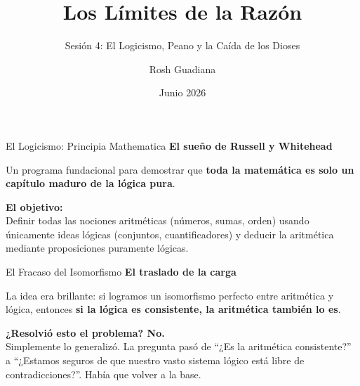 \documentclass[10pt, aspectratio=169]{beamer}
\title{Los Límites de la Razón}
\subtitle{Sesión 4: El Logicismo, Peano y la Caída de los Dioses}
\author{Rosh Guadiana}
\date{Junio 2026}
\begin{document}
\maketitle


\begin{frame}{El Logicismo: Principia Mathematica}
    \vspace{0.4cm}
    \Large \textbf{El sueño de Russell y Whitehead}
    
    \vspace{0.4cm}
    \normalsize
    Un programa fundacional para demostrar que \textbf{toda la matemática es solo un capítulo maduro de la lógica pura}. 
    
    \vspace{0.6cm}
    \alert{\textbf{El objetivo:}} \\
    Definir todas las nociones aritméticas (números, sumas, orden) usando únicamente ideas lógicas (conjuntos, cuantificadores) y deducir la aritmética mediante proposiciones puramente lógicas.
\end{frame}

\begin{frame}{El Fracaso del Isomorfismo}
    \vspace{0.3cm}
    \Large \textbf{El traslado de la carga}
    
    \vspace{0.4cm}
    \normalsize
    La idea era brillante: si logramos un isomorfismo perfecto entre aritmética y lógica, entonces \textbf{si la lógica es consistente, la aritmética también lo es}.
    
    \vspace{0.6cm}
    \alert{\textbf{¿Resolvió esto el problema? No.}} \\
    Simplemente lo generalizó. La pregunta pasó de ``¿Es la aritmética consistente?'' a ``¿Estamos seguros de que nuestro vasto sistema lógico está libre de contradicciones?''. Había que volver a la base.
\end{frame}

\end{document}
